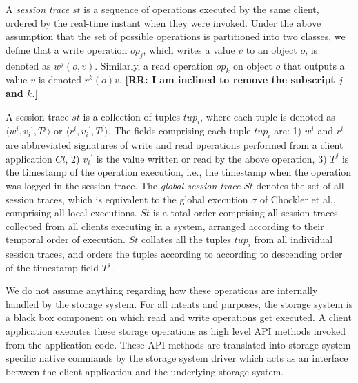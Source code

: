 \documentclass{sig-alternate-05-2015}
\begin{document}
  A \emph{session trace} $\mathit{st}$ is a sequence of operations executed by the same client, ordered by the real-time instant when they were invoked.
Under the above assumption that the set of possible operations is partitioned into two classes, we define that a write operation $\mathit{op}_j$, which writes a value $v$ to an object $o$, is denoted as $w^j(o,v)$. Similarly, a read operation $\mathit{op}_k$ on object $o$ that outputs a value $v$ is denoted $r^k(o){v}$. {\bf [RR: I am inclined to remove the subscript $j$ and $k$.]}
 \def\tuple#1{\langle #1\rangle}
\par A session trace $\mathit{st}$ is a collection of tuples $\mathit{tup}_i$, where each tuple is denoted as $\tuple{w^i, {v_i}^{'},T^j}$ or
 $\tuple{r^i, {v_i}^{'},T^j}$. The fields comprising each tuple $\mathit{tup}_i$ are: 1) $w^i$  and $r^i$ are abbreviated signatures of write and read
 operations performed from a client application $\mathit{Cl}$, 2) ${v_i}^{'}$ is the value written or read by the above operation,
 3) $T^j$ is the timestamp of the operation execution, i.e., the timestamp when the operation was logged in the
  session trace. The \emph{global session trace} $\mathit{St}$ denotes the set of all
   session traces, which is equivalent to the global execution $\sigma$ of Chockler et al., comprising all local
   executions.  $\mathit{St}$ is a total
    order comprising all session traces collected from all clients executing in a system, arranged
    according to their temporal order of execution.  $\mathit{St}$ collates
    all the tuples  $\mathit{tup}_i$ from all individual session  traces, and orders the tuples according to
   according to descending order of the timestamp field $T^j$.
   \par We do not assume anything regarding how these operations are internally handled by the storage system. For all intents and purposes, the storage system is a black box component on which read and write operations get executed. A client application executes these storage operations as high level API methods invoked from the application code. These API methods are translated into storage system specific native commands by the storage system driver which acts as an interface between the client application and the underlying storage system. %
\end{document}
